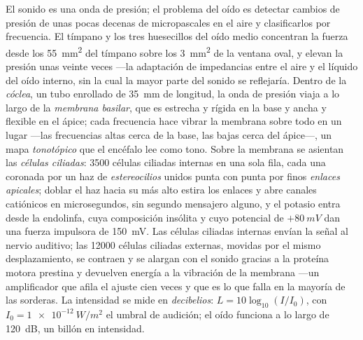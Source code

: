 \begin{definition}[La cóclea]\label{def:b3:sensory-systems:cochlea}
El sonido es una onda de presión; el problema del oído es detectar
cambios de presión de unas pocas decenas de micropascales en el aire y
clasificarlos por frecuencia. El tímpano y los tres huesecillos del
oído medio concentran la fuerza desde los \qty{55}{mm^2} del tímpano
sobre los \qty{3}{mm^2} de la ventana oval, y elevan la presión unas
veinte veces ---la adaptación de impedancias entre el aire y el líquido
del oído interno, sin la cual la mayor parte del sonido se reflejaría.
Dentro de la \emph{cóclea}, un tubo enrollado de \qty{35}{mm} de
longitud, la onda de presión viaja a lo largo de la \emph{membrana
basilar}, que es estrecha y rígida en la base y ancha y flexible en el
ápice; cada frecuencia hace vibrar la membrana sobre todo en un lugar
---las frecuencias altas cerca de la base, las bajas cerca del ápice---,
un mapa \emph{tonotópico} que el encéfalo lee como tono. Sobre la
membrana se asientan las \emph{células ciliadas}: \num{3500} células
ciliadas internas en una sola fila, cada una coronada por un haz de
\emph{estereocilios} unidos punta con punta por finos \emph{enlaces
apicales}; doblar el haz hacia su  más alto estira los enlaces y
abre canales catiónicos en microsegundos, sin segundo mensajero alguno,
y el potasio entra desde la endolinfa, cuya composición insólita y cuyo
potencial de $+\qty{80}{mV}$ dan una fuerza impulsora de \qty{150}{mV}.
Las células ciliadas internas envían la señal al nervio auditivo; las
\num{12000} células ciliadas externas, movidas por el mismo
desplazamiento, se contraen y se alargan con el sonido gracias a la
proteína motora prestina y devuelven energía a la vibración de la
membrana ---un amplificador que afila el ajuste cien veces y que es lo
que falla en la mayoría de las sorderas. La intensidad se mide en
\emph{decibelios}: $L = 10\log_{10}
(I/I_{0})$, con $I_{0} = \qty{1e-12}{W/m^2}$ el umbral de audición; el
oído funciona a lo largo de \qty{120}{dB}, un billón en intensidad.
\end{definition}

